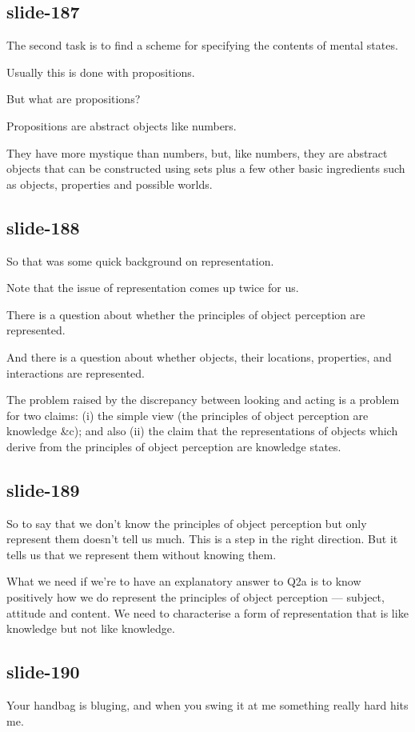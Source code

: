 \documentclass[12pt,\papersize]{extarticle}
\begin{document}
\subsection{slide-187}
The second task is to find a scheme for specifying the contents of mental states.
 
Usually this is done with propositions.
 
But what are propositions?
 
Propositions are abstract objects like numbers.
 
They have more mystique than numbers, but, like numbers, they are abstract objects that can be constructed using sets plus a few other basic ingredients such as objects, properties and possible worlds.
 
\subsection{slide-188}
So that was some quick background on representation.
 
Note that the issue of representation comes up twice for us.
 
There is a question about whether the principles of object perception are represented.
 
And there is a question about whether objects, their locations, properties, and interactions are represented.
 
The problem raised by the discrepancy between looking and acting is a problem for two claims: (i) the simple view (the principles of object perception are knowledge \&c); and also (ii) the claim that the representations of objects which derive from the principles of object perception are knowledge states.
 
\subsection{slide-189}
So to say that we don't know the principles of object perception but only represent them doesn't tell us much.
This is a step in the right direction.
But it tells us that we represent them without knowing them.
 
What we need if we're to have an explanatory answer to Q2a is to know positively how we do represent the principles of object perception --- subject, attitude and content.
We need to characterise a form of representation that is like knowledge but not like knowledge.
 
\subsection{slide-190}
Your handbag is bluging, and when you swing it at me something really hard hits me.
 
\end{document}
